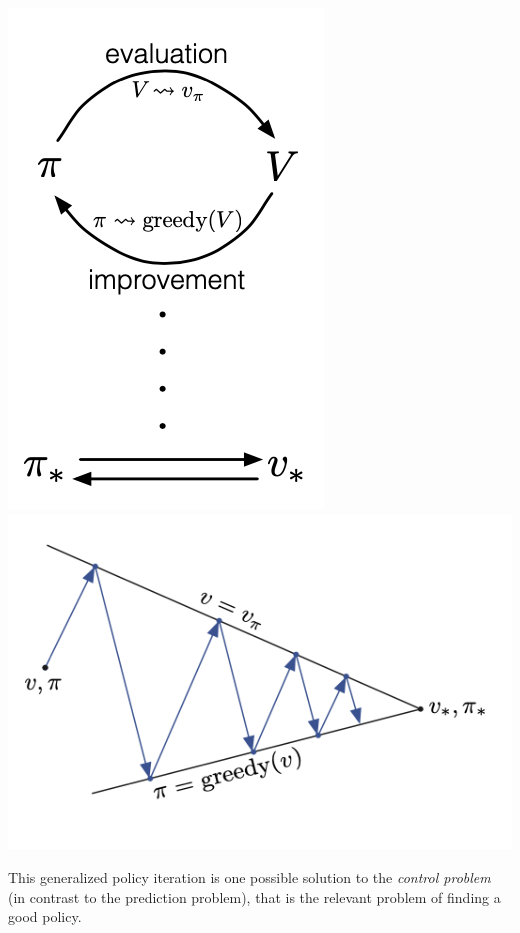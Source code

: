 \begin{minipage}{\linewidth}
\begin{center}
\includegraphics[scale=0.75]{graphics/generalized_policy_iteration.png}
\includegraphics[scale=1]{graphics/generalized_policy_iteration_2.png}
\end{center}
\end{minipage}


This generalized policy iteration is one possible solution to the \emph{control problem} (in contrast to the prediction problem), that is the relevant problem of finding a good policy. \\

